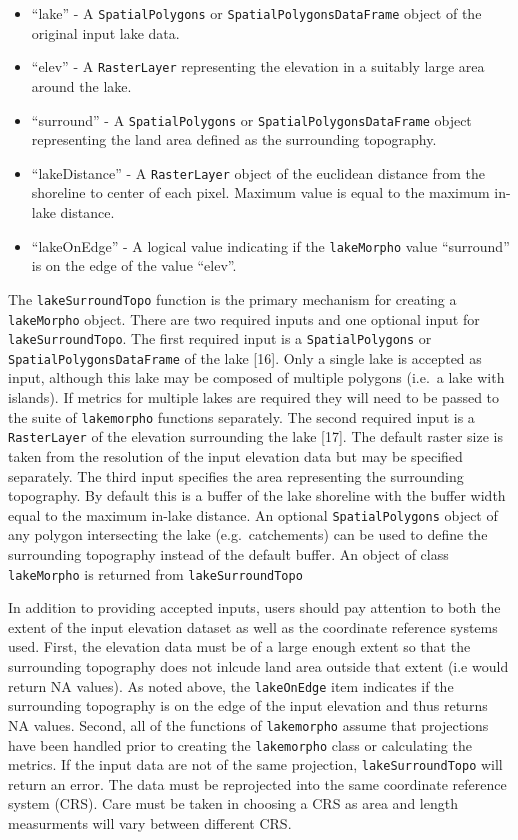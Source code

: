 \documentclass[11pt,]{article}
\providecommand{\tightlist}{%
  \setlength{\itemsep}{0pt}\setlength{\parskip}{0pt}}
\begin{document}
\begin{itemize}
\tightlist
\item
  ``lake'' - A \texttt{SpatialPolygons} or
  \texttt{SpatialPolygonsDataFrame} object of the original input lake
  data.
\item
  ``elev'' - A \texttt{RasterLayer} representing the elevation in a
  suitably large area around the lake.
\item
  ``surround'' - A \texttt{SpatialPolygons} or
  \texttt{SpatialPolygonsDataFrame} object representing the land area
  defined as the surrounding topography.
\item
  ``lakeDistance'' - A \texttt{RasterLayer} object of the euclidean
  distance from the shoreline to center of each pixel. Maximum value is
  equal to the maximum in-lake distance.
\item
  ``lakeOnEdge'' - A logical value indicating if the \texttt{lakeMorpho}
  value ``surround'' is on the edge of the value ``elev''.
\end{itemize}

The \texttt{lakeSurroundTopo} function is the primary mechanism for
creating a \texttt{lakeMorpho} object. There are two required inputs and
one optional input for \texttt{lakeSurroundTopo}. The first required
input is a \texttt{SpatialPolygons} or \texttt{SpatialPolygonsDataFrame}
of the lake {[}16{]}. Only a single lake is accepted as input, although
this lake may be composed of multiple polygons (i.e.~a lake with
islands). If metrics for multiple lakes are required they will need to
be passed to the suite of \texttt{lakemorpho} functions separately. The
second required input is a \texttt{RasterLayer} of the elevation
surrounding the lake {[}17{]}. The default raster size is taken from the
resolution of the input elevation data but may be specified separately.
The third input specifies the area representing the surrounding
topography. By default this is a buffer of the lake shoreline with the
buffer width equal to the maximum in-lake distance. An optional
\texttt{SpatialPolygons} object of any polygon intersecting the lake
(e.g.~catchements) can be used to define the surrounding topography
instead of the default buffer. An object of class \texttt{lakeMorpho} is
returned from \texttt{lakeSurroundTopo}

In addition to providing accepted inputs, users should pay attention to
both the extent of the input elevation dataset as well as the coordinate
reference systems used. First, the elevation data must be of a large
enough extent so that the surrounding topography does not inlcude land
area outside that extent (i.e would return NA values). As noted above,
the \texttt{lakeOnEdge} item indicates if the surrounding topography is
on the edge of the input elevation and thus returns NA values. Second,
all of the functions of \texttt{lakemorpho} assume that projections have
been handled prior to creating the \texttt{lakemorpho} class or
calculating the metrics. If the input data are not of the same
projection, \texttt{lakeSurroundTopo} will return an error. The data
must be reprojected into the same coordinate reference system (CRS).
Care must be taken in choosing a CRS as area and length measurments will
vary between different CRS.
\end{document}
